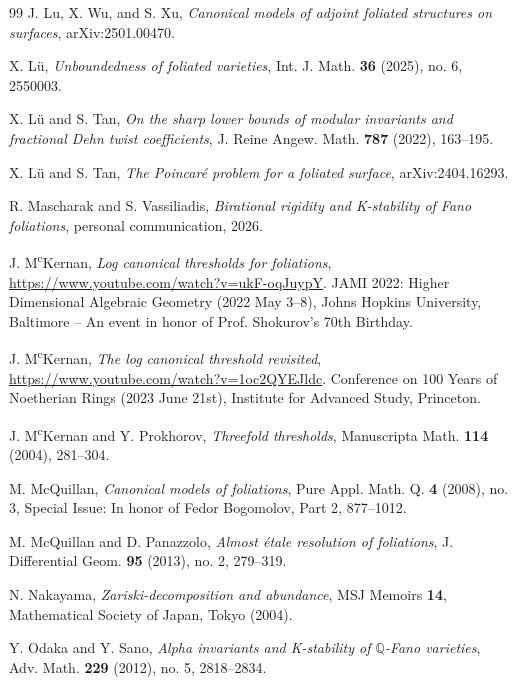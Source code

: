 \documentclass[11pt,reqno]{amsart}
\numberwithin{equation}{section}
\theoremstyle{definition}
\begin{document}
\begin{thebibliography}{99}
 J. Lu, X. Wu, and S. Xu, \textit{Canonical models of adjoint foliated structures on surfaces}, arXiv:2501.00470.

 X. L\"u, \textit{Unboundedness of foliated varieties}, Int. J. Math. \textbf{36} (2025), no. 6, 2550003.

 X. L\"u and S. Tan, \textit{On the sharp lower bounds of modular invariants and fractional Dehn twist coefficients}, J. Reine Angew. Math. \textbf{787} (2022), 163--195.

 X. L\"u and S. Tan, \textit{The Poincar\'e problem for a foliated surface}, arXiv:2404.16293.

 R. Mascharak and S. Vassiliadis, \textit{Birational rigidity and K-stability of Fano foliations}, personal communication, 2026.

 J. M\textsuperscript{c}Kernan, \textit{Log canonical thresholds for foliations}, \url{https://www.youtube.com/watch?v=ukF-oqJuypY}. JAMI 2022: Higher Dimensional Algebraic Geometry (2022 May 3--8), Johns Hopkins University, Baltimore -- An event in honor of Prof. Shokurov's 70th Birthday.

 J. M\textsuperscript{c}Kernan, \textit{The log canonical threshold revisited}, \url{https://www.youtube.com/watch?v=1oc2QYEJldc}. Conference on 100 Years of Noetherian Rings (2023 June 21st), Institute for Advanced Study, Princeton.

 J. M\textsuperscript{c}Kernan and Y. Prokhorov, \textit{Threefold thresholds}, Manuscripta Math. \textbf{114} (2004), 281--304.

 M. McQuillan, \textit{Canonical models of foliations}, Pure Appl. Math. Q. \textbf{4} (2008), no. 3, Special Issue: In honor of Fedor Bogomolov, Part 2, 877--1012.

 M. McQuillan and D. Panazzolo, \textit{Almost \'etale resolution of foliations}, J. Differential Geom. \textbf{95} (2013), no. 2, 279--319.

 N. Nakayama, \textit{Zariski-decomposition and abundance}, MSJ Memoirs \textbf{14}, Mathematical Society of Japan, Tokyo (2004).

 Y. Odaka and Y. Sano, \textit{Alpha invariants and K-stability of $\mathbb Q$-Fano varieties}, Adv. Math. \textbf{229} (2012), no. 5, 2818--2834.


\end{thebibliography}
\end{document}
